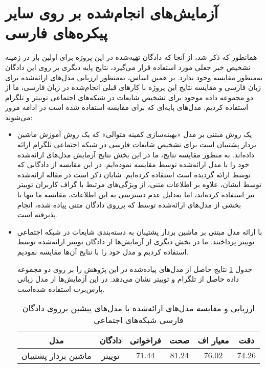 \section{آزمایش‌های انجام‌شده بر روی سایر پیکره‌های فارسی}
همانطور که ذکر شد، از آنجا که دادگان تهیه‌شده در این پروژه برای اولین بار در زمینه تشخیص خبر جعلی مورد استفاده قرار می‌گیرد، نتایج پایه دیگری بر روی این دادگان به‌منظور مقایسه وجود ندارد. بر همین اساس، به‌‌منظور ارزیابی مدل‌های ارائه‌شده برای زبان فارسی و مقایسه نتایج این پروژه با کارهای قبلی انجام‌شده در زبان فارسی، ما از دو مجموعه داده موجود برای تشخیص شایعات در شبکه‌های اجتماعی توییتر و تلگرام استفاده کردیم. مدل‌های پایه‌ای که برای مقایسه استفاده شده ‌است در ادامه مرور می‌شوند:
\begin{itemize}
\item
\cite{zamani2017rumor}
یک روش مبتنی‌ بر مدل «بهینه‌سازی کمینه متوالی» که یک روش آموزش ماشین بردار پشتیبان است برای تشخیص شایعات فارسی در شبکه اجتماعی تلگرام ارائه داده‌اند. به منظور مقایسه نتایج، ما در این بخش نتایج آزمایش‌ مدل‌های ارائه‌شده خود را با مدل ارائه‌شده توسط \cite{zamani2017rumor} مقایسه نموده‌ایم. در این مقایسه از دادگانی که توسط \cite{zamani2017rumor} ارائه گردیده است استفاده کرده‌ایم. شایان ذکر است در مقاله ارائه‌شده توسط ایشان، علاوه بر اطلاعات متنی، از ویژگی‌های مرتبط با گراف کاربران توییتر نیز استفاده کرده‌اند، اما به‌دلیل عدم دسترسی به این اطلاعات، مقایسه ما تنها با بخشی از مدل‌های ارائه‌شده توسط \cite{zamani2017rumor}  که برروی دادگان متنی پیاده شده، انجام پذیرفته ‌است.

\item
\citet{jahanbakhsh2020model}
با ارائه مدل مبتنی‌ بر ماشین بردار پشتیبان به دسته‌بندی شایعات در شبکه اجتماعی توییتر پرداختند. ما در بخش دیگری از آزمایش‌ها از دادگان توییتر ارائه‌شده توسط \citet{jahanbakhsh2020model} استفاده کردیم و مدل خود را با نتایج آن‌ها مقایسه نمودیم.

جدول \ref{table.comparison} نتایج حاصل از مدل‌های پیاده‌شده در این پژوهش را بر روی دو مجموعه داده حاصل از تلگرام و توییتر نشان می‌دهد. در این آزمایش‌ها از مدل زبانی پارس‌برت استفاده شده‌است.


\begin{table}
	\caption{ارزیابی و مقایسه مدل‌های ارائه‌شده با مدل‌های پیشین برروی دادگان فارسی شبکه‌های اجتماعی}
	\label{table.comparison}
	\begin{center}
		\begin{tabular}{|c|c|c|c|c|c|}
			\hline
			مدل & دادگان & فراخوانی & صحت & معیار اف & دقت \\
			\hline
			\hline
			ماشین بردار پشتیبان \citep{zamani2017rumor} & 
			\multirow{4}{*}{توییتر} &$71.44$&$81.24$& $76.02$ & $74.26$ \\
			

\end{tabular}
\end{center}
\end{table}
\end{itemize}
